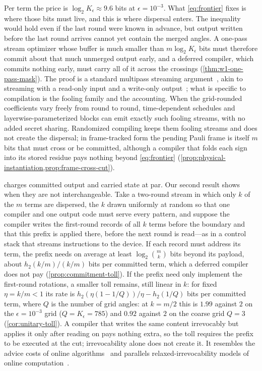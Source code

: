 \documentclass[aps,prx,reprint,superscriptaddress,floatfix,longbibliography]{revtex4-2}
\begin{document}
Per term the price is $\log_2K_\epsilon\approx9.6$ bits at
$\epsilon=10^{-3}$.  What \cref{eq:frontier} fixes is where those bits
must live, and this is where dispersal enters.  The inequality would hold
even if the last round were known in advance, but output written before
the last round arrives cannot yet contain the merged angles.  A one-pass
stream optimizer whose buffer is much smaller than $m\log_2K_\epsilon$
bits must therefore commit about that much unmerged output early, and a
deferred compiler, which commits nothing early, must carry all of it
across the crossings (\cref{thm:w1-one-pass-mask}).  The proof is a
standard multipass streaming
argument~\cite{alon1999space,guha2008tight,kushilevitz1997communication},
akin to streaming with a read-only input and a write-only
output~\cite{francois2014unidirectional}; what is specific to compilation
is the fooling family and the accounting.  When the grid-rounded
coefficients vary freely from round to round, time-dependent schedules and
layerwise-parameterized blocks can emit exactly such fooling streams, with
no added secret sharing.  Randomized compiling keeps them fooling streams
and does not create the dispersal; in frame-tracked form the pending Pauli
frame is itself $m$ bits that must cross or be committed, although a
compiler that folds each sign into its stored residue pays nothing beyond
\cref{eq:frontier}
(\cref{prop:physical-instantiation,prop:frame-cross-cut}).

 charges committed output and carried state at par.  Our
second result shows when they are not interchangeable.  Take a two-round
stream in which only $k$ of the $m$ terms are dispersed, the $k$ drawn
uniformly at random so that one compiler and one output code must serve
every pattern, and suppose the compiler writes the first-round
records of all $k$ terms before the boundary and that this prefix is
applied there, before the next round is read---as in a control stack that
streams instructions to the device.  If each record must address its term,
the prefix needs on average at least $\log_2\binom{m}{k}$ bits beyond its
payload, about $h_2(k/m)/(k/m)$ bits per committed term, which a deferred
compiler does not pay (\cref{prop:commitment-toll}).  If the prefix need
only implement the first-round rotations, a smaller toll remains, still
linear in $k$: for fixed $\eta=k/m<1$ its rate is
$h_2(\eta(1-1/Q))/\eta-h_2(1/Q)$ bits per committed term, where $Q$ is the
number of grid angles: at $k=m/2$ this is $1.99$ against $2$ on the
$\epsilon=10^{-3}$ grid ($Q=K_\epsilon=785$) and $0.92$ against $2$ on
the coarse grid $Q=3$ (\cref{cor:unitary-toll}).  A compiler that writes the same content
irrevocably but applies it only after reading on pays nothing extra, so
the toll requires the prefix to be executed at the cut; irrevocability
alone does not create it.  It resembles the advice costs of online
algorithms~\cite{bockenhauer2014string,boyar2017online} and parallels
relaxed-irrevocability models of online
computation~\cite{boyar2022relaxing}.
\end{document}
